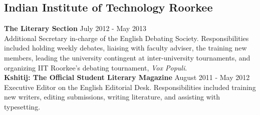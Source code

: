 \documentclass[12pt]{article}
\begin{document}
\subsection*{Indian Institute of Technology Roorkee}
\textbf{The Literary Section} \hfill July 2012 - May 2013\\
Additional Secretary in-charge of the English Debating Society. Responsibilities included holding weekly debates, liaising with faculty adviser, the training new members, leading the university contingent at inter-university tournaments, and organizing IIT Roorkee's debating tournament, \textit{Vox Populi}. \\

\textbf{Kshitij: The Official Student Literary Magazine} \hfill August 2011 - May 2012\\
Executive Editor on the English Editorial Desk. Responsibilities included training new writers, editing submissions, writing literature, and assisting with typesetting. \\
\end{document}
